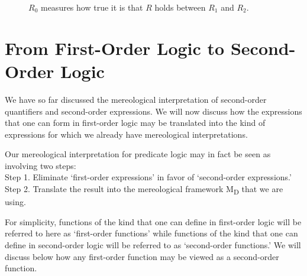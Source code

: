 \documentclass[12pt]{book}
\begin{document}
\begin{figure}[htbp]
\centering
{}
\caption{$R_0$ measures how true it is that $R$ holds between $R_1$ and $R_2$.}
\label{fig:diamonds}
\end{figure}

\section{From First-Order Logic to Second-Order Logic} \label{from_first_order_to_second_order}
We have so far discussed the mereological interpretation of second-order quantifiers and second-order expressions. We will now discuss how the expressions that one can form in first-order logic may be translated into the kind of expressions for which we already have mereological interpretations.

Our mereological interpretation for predicate logic may in fact be seen as involving two steps:\\
Step 1. Eliminate `first-order expressions' in favor of `second-order expressions.'\\
Step 2. Translate the result into the mereological framework M\textsubscript{D} that we are using.

For simplicity, functions of the kind that one can define in first-order logic will be referred to here as `first-order functions' while functions of the kind that one can define in second-order logic will be referred to as `second-order functions.' We will discuss below how any first-order function may be viewed as a second-order function.
\end{document}
